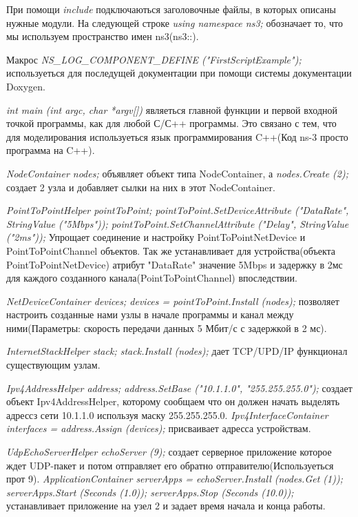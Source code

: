 \documentclass[14pt,a4paper]{article}
\begin{document}
При помощи \textit{include} подключаються заголовочные
файлы, в которых описаны нужные модули. На следующей строке \textit{using
namespace ns3;} обозначает то, что мы используем пространство имен ns3(ns3::).

Макрос \textit{NS\_LOG\_COMPONENT\_DEFINE ("FirstScriptExample");}
используеться для последущей документации при помощи системы документации Doxygen.

\textit{int main (int argc, char *argv[])} являеться главной функции и первой
входной точкой программы, как для любой С/С++ программы. Это связано с тем, что
для моделирования используеться язык программирования C++(Код ns-3 просто
программа на C++).

\textit{NodeContainer nodes;} объявляет объект типа NodeContainer, а
\textit{nodes.Create (2);} создает 2 узла и добавляет сылки на них в
этот NodeContainer.


\textit{PointToPointHelper pointToPoint; 
pointToPoint.SetDeviceAttribute ("DataRate", StringValue ("5Mbps")); 
pointToPoint.SetChannelAttribute ("Delay", StringValue ("2ms"));} 
Упрощает соединение и настройку PointToPointNetDevice и PointToPointChannel
объектов. Так же устанавливает для устройства(объекта PointToPointNetDevice)
атрибут "DataRate" значение 5Mbps и задержку в 2мс для каждого созданного
канала(PointToPointChannel) впоследствии.

\textit{NetDeviceContainer devices; 
devices = pointToPoint.Install (nodes);} позволяет настроить созданные нами
узлы в начале программы и канал между ними(Параметры: скорость передачи данных
5 Мбит/с с задержкой в 2 мс).

\textit{InternetStackHelper stack;
 stack.Install (nodes);} дает TCP/UPD/IP функционал существующим узлам.

\textit{Ipv4AddressHelper address; 
address.SetBase ("10.1.1.0", "255.255.255.0");} создает объект
Ipv4AddressHelper, которому сообщаем что он должен начать выделять адрессз сети
10.1.1.0 используя маску 255.255.255.0.
\textit{Ipv4InterfaceContainer interfaces = address.Assign (devices);} 
присваивает адресса устройствам.

\textit{UdpEchoServerHelper echoServer (9);} создает серверное приложение
которое ждет UDP-пакет и потом отправляет его обратно отправителю(Используеться прот 9).
\textit{ApplicationContainer serverApps = echoServer.Install (nodes.Get (1)); serverApps.Start (Seconds (1.0));
  serverApps.Stop (Seconds (10.0));} устанавливает приложение на узел 2 и задает
  время начала и конца работы.
  
\end{document}
